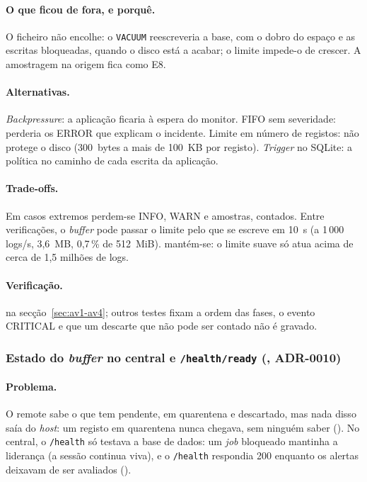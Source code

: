\paragraph{O que ficou de fora, e porquê.}
O ficheiro não encolhe: o \texttt{VACUUM} reescreveria a base, com o dobro do espaço e as escritas bloqueadas,
quando o disco está a acabar; o limite impede-o de crescer. A amostragem na origem fica como E8.

\paragraph{Alternativas.}
\emph{Backpressure}: a aplicação ficaria à espera do monitor. FIFO sem severidade: perderia os ERROR que explicam o
incidente. Limite em número de registos: não protege o disco (300~bytes a mais de 100~KB por registo).
\emph{Trigger} no SQLite: a política no caminho de cada escrita da aplicação.

\paragraph{Trade-offs.}
Em casos extremos perdem-se INFO, WARN e amostras, contados. Entre verificações, o \emph{buffer} pode passar o
limite pelo que se escreve em 10~s (a 1\,000 logs/s, 3,6~MB, 0,7\,\% de 512~MiB).  mantém-se: o limite
suave só atua acima de cerca de 1,5 milhões de logs.

\paragraph{Verificação.}
 na secção~\ref{sec:av1-av4}; outros testes fixam a ordem das fases, o evento CRITICAL e que um descarte
que não pode ser contado não é gravado.

\subsubsection{Estado do \emph{buffer} no central e \texttt{/health/ready} (, ADR-0010)}
\label{sec:d17}

\paragraph{Problema.}
O remote sabe o que tem pendente, em quarentena e descartado, mas nada disso saía do \emph{host}: um registo em
quarentena nunca chegava, sem ninguém saber (). No central, o \texttt{/health} só testava a base de dados:
um \emph{job} bloqueado mantinha a liderança (a sessão continua viva), e o \texttt{/health} respondia 200 enquanto
os alertas deixavam de ser avaliados ().

